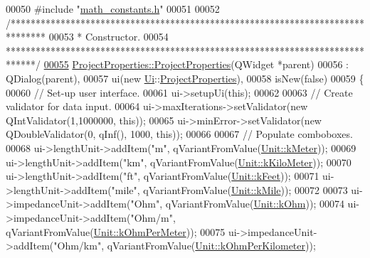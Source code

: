 \begin{DoxyCode}
00050 \textcolor{preprocessor}{#include "\hyperlink{math__constants_8h}{math\_constants.h}"}
00051 
00052 \textcolor{comment}{/*******************************************************************************}
00053 \textcolor{comment}{ * Constructor.}
00054 \textcolor{comment}{ ******************************************************************************/}
\hypertarget{projectproperties_8cpp_source_l00055}{}\hyperlink{group___window_gad98f3b25db75d19fc7d99b65157fc3f0}{00055} \hyperlink{group___window_gad98f3b25db75d19fc7d99b65157fc3f0}{ProjectProperties::ProjectProperties}(QWidget *parent)
00056   : QDialog(parent),
00057     ui(new \hyperlink{namespace_ui}{Ui}::\hyperlink{class_project_properties}{ProjectProperties}),
00058     isNew(false)
00059 \{
00060   \textcolor{comment}{// Set-up user interface.}
00061   ui->setupUi(\textcolor{keyword}{this});
00062 
00063   \textcolor{comment}{// Create validator for data input.}
00064   ui->maxIterations->setValidator(\textcolor{keyword}{new} QIntValidator(1,1000000, \textcolor{keyword}{this}));
00065   ui->minError->setValidator(\textcolor{keyword}{new} QDoubleValidator(0, qInf(), 1000, \textcolor{keyword}{this}));
00066 
00067   \textcolor{comment}{// Populate comboboxes.}
00068   ui->lengthUnit->addItem(\textcolor{stringliteral}{"m"}, qVariantFromValue(\hyperlink{class_unit_a8c8921f7b225ad6063b1cb573425b9a0abfa41ebe7ee649a1f02c9b8ae570434b}{Unit::kMeter}));
00069   ui->lengthUnit->addItem(\textcolor{stringliteral}{"km"}, qVariantFromValue(\hyperlink{class_unit_a8c8921f7b225ad6063b1cb573425b9a0a1c04f3dd196dbe1832a2658215b0d919}{Unit::kKiloMeter}));
00070   ui->lengthUnit->addItem(\textcolor{stringliteral}{"ft"}, qVariantFromValue(\hyperlink{class_unit_a8c8921f7b225ad6063b1cb573425b9a0a9ac9b167b0ebce477fb53d6ace04ddc8}{Unit::kFeet}));
00071   ui->lengthUnit->addItem(\textcolor{stringliteral}{"mile"}, qVariantFromValue(\hyperlink{class_unit_a8c8921f7b225ad6063b1cb573425b9a0a2ebde742068bbee0510de32fbb4cd724}{Unit::kMile}));
00072 
00073   ui->impedanceUnit->addItem(\textcolor{stringliteral}{"Ohm"}, qVariantFromValue(\hyperlink{class_unit_a3747e779c805df24a71961290be3fbdfa6b9c74d1763eefbaf751eeecff0bd9da}{Unit::kOhm}));
00074   ui->impedanceUnit->addItem(\textcolor{stringliteral}{"Ohm/m"}, qVariantFromValue(\hyperlink{class_unit_a3747e779c805df24a71961290be3fbdfa35e9ca44deb5a35fdb576111cf0db336}{Unit::kOhmPerMeter}));
00075   ui->impedanceUnit->addItem(\textcolor{stringliteral}{"Ohm/km"}, qVariantFromValue(\hyperlink{class_unit_a3747e779c805df24a71961290be3fbdfa56a0289d2ddeff7ca4aa8ba410df79d6}{Unit::kOhmPerKilometer}));

\end{DoxyCode}

